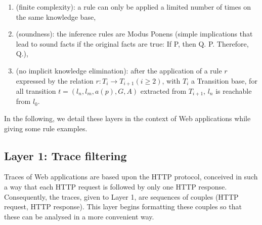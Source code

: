 \begin{enumerate}
\item (finite complexity): a rule can only be applied a limited number of times on the same knowledge base,
\item (soundness): the inference rules are Modus Ponens (simple
implications that lead to sound facts if the original facts are
true: If P, then Q. P. Therefore, Q.),
\item (no implicit knowledge elimination): after the application of a rule $r$ expressed by the relation $r: T_i \rightarrow
T_{i+1} (i\geq 2)$, with $T_i$ a Transition base, for all transition $t=(l_n,l_m,a(p),G,A)$ extracted from
$T_{i+1}$, $l_n$ is reachable from $l_0$.
\end{enumerate}

In the following, we detail these layers in the context of Web
applications while giving some rule examples.

\subsection{Layer 1: Trace filtering}
\label{sec:modelinf:webapps:L1}

Traces of Web applications are based upon the HTTP protocol,
conceived in such a way that each HTTP request is followed by
only one HTTP response. Consequently, the traces, given to Layer
1, are sequences of couples (HTTP request, HTTP response). This
layer begins formatting these couples so that these can be
analysed in a more convenient way.

